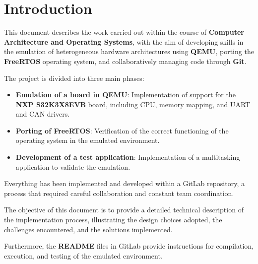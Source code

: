 \section{Introduction}

This document describes the work carried out within the course of \textbf{Computer Architecture and Operating Systems}, with the aim of developing skills in the emulation of heterogeneous hardware architectures using \textbf{QEMU}, porting the \textbf{FreeRTOS} operating system, and collaboratively managing code through \textbf{Git}.

\noindent The project is divided into three main phases:
\begin{itemize}
    \item \textbf{Emulation of a board in QEMU}: Implementation of support for the \textbf{NXP S32K3X8EVB} board, including CPU, memory mapping, and UART and CAN drivers.
    \item \textbf{Porting of FreeRTOS}: Verification of the correct functioning of the operating system in the emulated environment.
    \item \textbf{Development of a test application}: Implementation of a multitasking application to validate the emulation.
\end{itemize}

Everything has been implemented and developed within a GitLab repository, a process that required careful collaboration and constant team coordination.

The objective of this document is to provide a detailed technical description of the implementation process, illustrating the design choices adopted, the challenges encountered, and the solutions implemented.

Furthermore, the \textbf{README} files in GitLab provide instructions for compilation, execution, and testing of the emulated environment.

